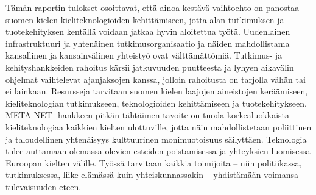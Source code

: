 \begin{multicols}{2}
Tämän raportin tulokset osoittavat, että ainoa kestävä vaihtoehto on
panostaa suomen kielen kieliteknologioiden kehittämiseen, jotta alan
tutkimuksen ja tuotekehityksen kentällä voidaan jatkaa hyvin
aloitettua työtä. Uudenlainen infrastruktuuri ja yhtenäinen
tutkimusorganisaatio ja näiden mahdollistama kansallinen ja
kansainvälinen yhteistyö ovat välttämättömiä. Tutkimus- ja
kehityshankkeiden rahoitus kärsii jatkuvuuden puutteesta ja lyhyen
aikavälin ohjelmat vaihtelevat ajanjaksojen kanssa, jolloin rahoitusta
on tarjolla vähän tai ei lainkaan. Resursseja tarvitaan suomen kielen
laajojen aineistojen keräämiseen, kieliteknologian tutkimukseen,
teknologioiden kehittämiseen ja tuotekehitykseen.\\
META-NET -hankkeen pitkän tähtäimen tavoite on tuoda korkealuokkaista
kieliteknologiaa kaikkien kielten ulottuville, jotta näin
mahdollistetaan poliittinen ja taloudellinen yhtenäisyys kulttuurinen
monimuotoisuus säilyttäen. Teknologia tulee auttamaan olemassa olevien
esteiden poistamisessa ja yhteyksien luomisessa Euroopan kielten
välille. Työssä tarvitaan kaikkia toimijoita – niin politiikassa,
tutkimuksessa, liike-elämässä kuin yhteiskunnassakin – yhdistämään voimansa
tulevaisuuden eteen.
\end{multicols}

\clearpage

